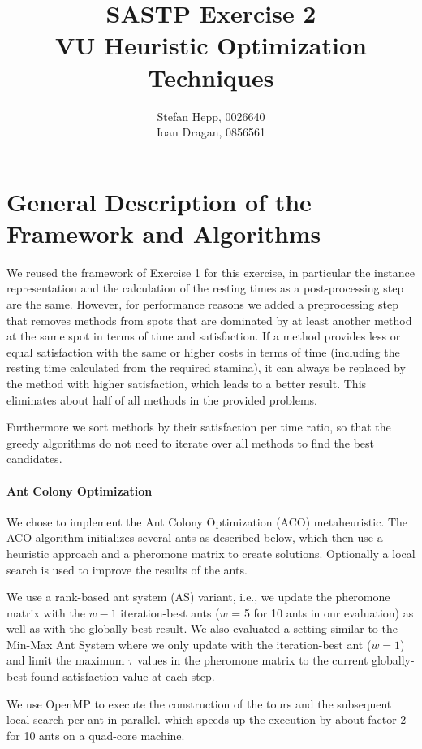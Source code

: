 \documentclass{article}
\title{SASTP Exercise 2\\
{VU Heuristic Optimization Techniques} }
\author{Stefan Hepp, 0026640 \\
Ioan Dragan, 0856561 }
\begin{document}
\maketitle
\section{General Description of the Framework and Algorithms}

We reused the framework of Exercise 1 for this exercise, in particular the instance representation and the calculation of the resting times
as a post-processing step are the same. However, for performance reasons we added a preprocessing step that removes methods from spots that
are dominated by at least another method at the same spot in terms of time and satisfaction. If a method provides less or equal satisfaction
with the same or higher costs in terms of time (including the resting time calculated from the required stamina), it can always be replaced
by the method with higher satisfaction, which leads to a better result. This eliminates about half of all methods in the provided problems. 

Furthermore we sort methods by their satisfaction per time ratio, so that the greedy algorithms do not need to iterate over all methods to find the best candidates.

\paragraph{Ant Colony Optimization}

We chose to implement the Ant Colony Optimization (ACO) metaheuristic. The ACO algorithm initializes several ants as described below, which
then use a heuristic approach and a pheromone matrix to create solutions. Optionally a local search is used to improve the results of the
ants. 

We use a rank-based ant system (AS) variant, i.e., we update the pheromone matrix with the $w-1$ iteration-best ants ($w$ = 5 for 10 ants in our
evaluation) as well as with the globally best result. We also evaluated a setting similar to the Min-Max Ant System where we only update
with the iteration-best ant ($w=1$) and limit the maximum $\tau$ values in the pheromone matrix to the current globally-best found
satisfaction value at each step.

We use OpenMP to execute the construction of the tours and the subsequent local search per ant in parallel.
which speeds up the execution by about factor $2$ for 10 ants on a quad-core machine.
\end{document}
